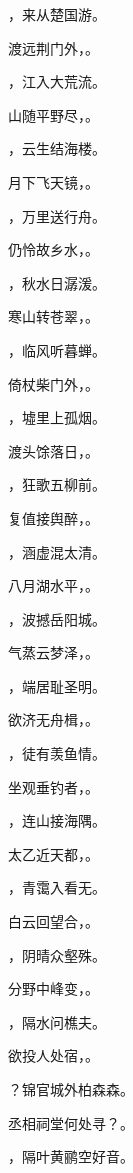 \documentclass[12pt, a4paper, addpoints, answers]{exam}
\begin{document}
\begin{questions}
\question[3] \fillin，来从楚国游。

\question[3] 渡远荆门外，\fillin。

\question[3] \fillin，江入大荒流。

\question[3] 山随平野尽，\fillin。

\question[3] \fillin，云生结海楼。

\question[3] 月下飞天镜，\fillin。

\question[3] \fillin，万里送行舟。

\question[3] 仍怜故乡水，\fillin。

\question[3] \fillin，秋水日潺湲。

\question[3] 寒山转苍翠，\fillin。

\question[3] \fillin，临风听暮蝉。

\question[3] 倚杖柴门外，\fillin。

\question[3] \fillin，墟里上孤烟。

\question[3] 渡头馀落日，\fillin。

\question[3] \fillin，狂歌五柳前。

\question[3] 复值接舆醉，\fillin。

\question[3] \fillin，涵虚混太清。

\question[3] 八月湖水平，\fillin。

\question[3] \fillin，波撼岳阳城。

\question[3] 气蒸云梦泽，\fillin。

\question[3] \fillin，端居耻圣明。

\question[3] 欲济无舟楫，\fillin。

\question[3] \fillin，徒有羡鱼情。

\question[3] 坐观垂钓者，\fillin。

\question[3] \fillin，连山接海隅。

\question[3] 太乙近天都，\fillin。

\question[3] \fillin，青霭入看无。

\question[3] 白云回望合，\fillin。

\question[3] \fillin，阴晴众壑殊。

\question[3] 分野中峰变，\fillin。

\question[3] \fillin，隔水问樵夫。

\question[3] 欲投人处宿，\fillin。

\question[3] \fillin？锦官城外柏森森。

\question[3] 丞相祠堂何处寻？\fillin。

\question[3] \fillin，隔叶黄鹂空好音。


\end{questions}
\end{document}
